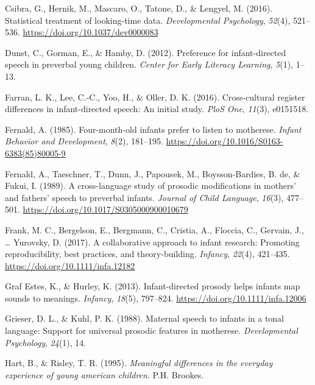 \documentclass[
  english,
  ,man,floatsintext]{apa6}
\newlength{\cslhangindent}
\newenvironment{CSLReferences}[2] %
 {\begin{list}{}{%
  \setlength{\itemindent}{0pt}
  \setlength{\leftmargin}{0pt}
  \setlength{\parsep}{0pt}
  \ifodd #1
   \setlength{\leftmargin}{\cslhangindent}
   \setlength{\itemindent}{-1\cslhangindent}
  \fi
  \setlength{\itemsep}{#2\baselineskip}}}
 {\end{list}}
\begin{document}
\begin{CSLReferences}{1}{0}
Csibra, G., Hernik, M., Mascaro, O., Tatone, D., \& Lengyel, M. (2016). Statistical treatment of looking-time data. \emph{Developmental Psychology}, \emph{52}(4), 521--536. \url{https://doi.org/10.1037/dev0000083}

Dunst, C., Gorman, E., \& Hamby, D. (2012). Preference for infant-directed speech in preverbal young children. \emph{Center for Early Literacy Learning}, \emph{5}(1), 1--13.

Farran, L. K., Lee, C.-C., Yoo, H., \& Oller, D. K. (2016). Cross-cultural register differences in infant-directed speech: An initial study. \emph{PloS One}, \emph{11}(3), e0151518.

Fernald, A. (1985). Four-month-old infants prefer to listen to motherese. \emph{Infant Behavior and Development}, \emph{8}(2), 181--195. \url{https://doi.org/10.1016/S0163-6383(85)80005-9}

Fernald, A., Taeschner, T., Dunn, J., Papousek, M., Boysson-Bardies, B. de, \& Fukui, I. (1989). A cross-language study of prosodic modifications in mothers' and fathers' speech to preverbal infants. \emph{Journal of Child Language}, \emph{16}(3), 477--501. \url{https://doi.org/10.1017/S0305000900010679}

Frank, M. C., Bergelson, E., Bergmann, C., Cristia, A., Floccia, C., Gervain, J., \ldots{} Yurovsky, D. (2017). A collaborative approach to infant research: Promoting reproducibility, best practices, and theory-building. \emph{Infancy}, \emph{22}(4), 421--435. \url{https://doi.org/10.1111/infa.12182}

Graf Estes, K., \& Hurley, K. (2013). Infant-directed prosody helps infants map sounds to meanings. \emph{Infancy}, \emph{18}(5), 797--824. \url{https://doi.org/10.1111/infa.12006}

Grieser, D. L., \& Kuhl, P. K. (1988). Maternal speech to infants in a tonal language: Support for universal prosodic features in motherese. \emph{Developmental Psychology}, \emph{24}(1), 14.

Hart, B., \& Risley, T. R. (1995). \emph{Meaningful differences in the everyday experience of young american children}. P.H. Brookes.


\end{CSLReferences}
\end{document}
